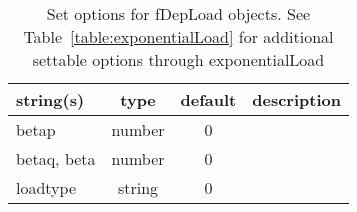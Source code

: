 \begin{table}[ht]
\centering
\begin{tabular}{p{5cm} c c p{7cm}}
\hline
string(s) & type & default & description \\
\hline
betap & number & 0 & \\
betaq, beta & number & 0 & \\
loadtype & string & 0 & \\
\hline
\end{tabular}
\caption{Set options for fDepLoad objects. See Table~\ref{table:exponentialLoad} for additional settable options through exponentialLoad}
\label{table:fDepLoad}
\end{table}

